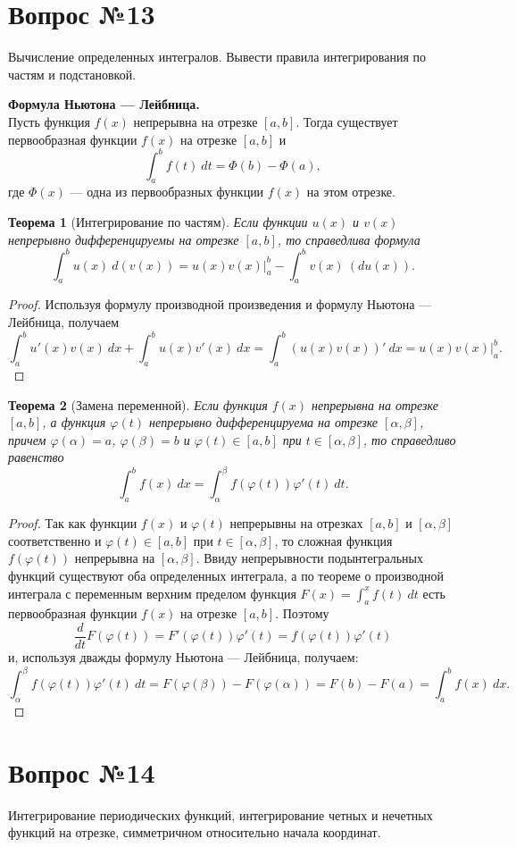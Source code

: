\documentclass[12pt]{article}
\numberwithin{equation}{section}
\newtheorem{theorem}{Теорема}[section]
\begin{document}
\section{Вопрос №13} %
\begin{framed}
Вычисление определенных интегралов. Вывести правила интегрирования по частям и подстановкой.
\end{framed}

\textbf{Формула Ньютона --- Лейбница.}\\

Пусть функция $f(x)$ непрерывна на отрезке $[a,b]$. Тогда существует первообразная функции $f(x)$ на отрезке $[a,b]$ и
\[ \int_a^b f(t)~dt = \Phi(b) - \Phi(a), \]
где $\Phi(x)$ --- одна из первообразных функции $f(x)$ на этом отрезке.

\begin{theorem}[Интегрирование по частям] \label{th:13:1}
Если функции $u(x)$ и $v(x)$ непрерывно дифференцируемы на отрезке $[a,b]$, то справедлива формула
\[ \int_a^b u(x) ~d(v(x)) = u(x) v(x) \biggr\vert_a^b - \int_a^b v(x)~(du(x)).\]
\end{theorem}
\begin{proof}
Используя формулу производной произведения и формулу Ньютона --- Лейбница, получаем
\[ \int_a^b u'(x) v(x) ~dx + \int_a^b u(x) v'(x) ~dx = \int_a^b(u(x)v(x))' ~dx = u(x)  v(x) \biggr\vert_a^b.\]
\end{proof}

\begin{theorem} [Замена переменной]\label{th:13:2}
Если функция $f(x)$ непрерывна на отрезке $[a,b]$, а функция $\varphi(t)$ непрерывно дифференцируема на отрезке $[\alpha, \beta]$, причем $\varphi(\alpha) = a$, $\varphi(\beta) = b$ и $\varphi(t) \in [a,b]$ при $t \in [\alpha, \beta]$, то справедливо равенство
\[ \int_a^b f(x)~dx = \int_{\alpha}^{\beta} f(\varphi(t)) \varphi'(t)~dt.\]
\end{theorem}
\begin{proof}
Так как функции $f(x)$ и $\varphi(t)$ непрерывны на отрезках $[a,b]$ и $[\alpha, \beta]$ соответственно и $\varphi(t) \in [a,b]$ при $t \in [\alpha, \beta]$, то сложная функция $f(\varphi(t))$ непрерывна на $[\alpha, \beta]$. Ввиду непрерывности подынтегральных функций существуют оба  определенных интеграла, а по теореме о производной интеграла с переменным верхним пределом функция $F(x) = \int_a^x f(t)~dt$ есть первообразная функции $f(x)$ на отрезке $[a,b]$. Поэтому
\[ \frac{d}{dt}F(\varphi(t)) = F'(\varphi(t)) \varphi'(t) = f(\varphi(t))\varphi'(t)\]
и, используя дважды формулу Ньютона --- Лейбница, получаем:
\[ \int_{\alpha}^{\beta} f(\varphi(t))\varphi'(t)~dt = F(\varphi(\beta)) -F(\varphi(\alpha)) = F(b) - F(a) = \int_a^b f(x)~dx. \]
\end{proof}

\section{Вопрос №14} %
\begin{framed}
Интегрирование периодических функций, интегрирование четных и нечетных функций на
отрезке, симметричном относительно начала координат.
\end{framed}
\end{document}
